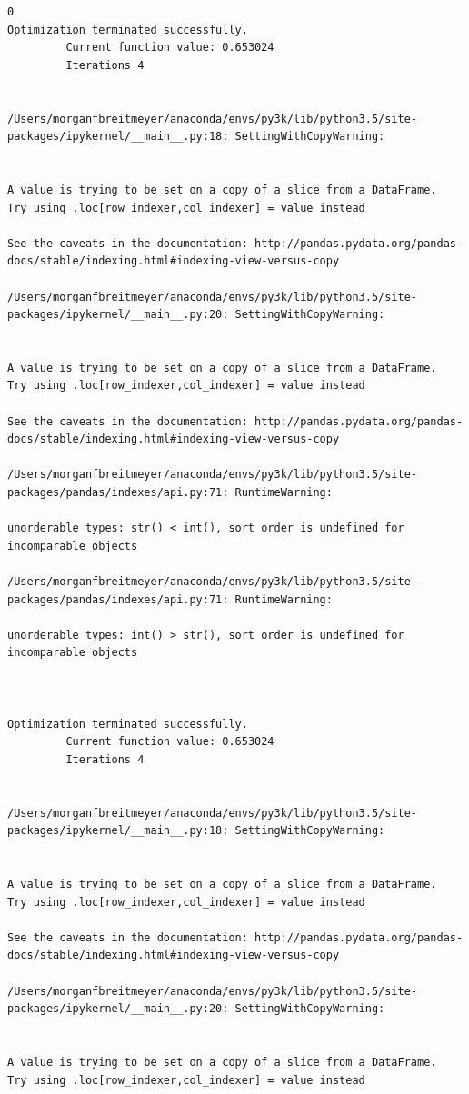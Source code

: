 \begin{lstlisting}
0
Optimization terminated successfully.
         Current function value: 0.653024
         Iterations 4


/Users/morganfbreitmeyer/anaconda/envs/py3k/lib/python3.5/site-packages/ipykernel/__main__.py:18: SettingWithCopyWarning:


A value is trying to be set on a copy of a slice from a DataFrame.
Try using .loc[row_indexer,col_indexer] = value instead

See the caveats in the documentation: http://pandas.pydata.org/pandas-docs/stable/indexing.html#indexing-view-versus-copy

/Users/morganfbreitmeyer/anaconda/envs/py3k/lib/python3.5/site-packages/ipykernel/__main__.py:20: SettingWithCopyWarning:


A value is trying to be set on a copy of a slice from a DataFrame.
Try using .loc[row_indexer,col_indexer] = value instead

See the caveats in the documentation: http://pandas.pydata.org/pandas-docs/stable/indexing.html#indexing-view-versus-copy

/Users/morganfbreitmeyer/anaconda/envs/py3k/lib/python3.5/site-packages/pandas/indexes/api.py:71: RuntimeWarning:

unorderable types: str() < int(), sort order is undefined for incomparable objects

/Users/morganfbreitmeyer/anaconda/envs/py3k/lib/python3.5/site-packages/pandas/indexes/api.py:71: RuntimeWarning:

unorderable types: int() > str(), sort order is undefined for incomparable objects



Optimization terminated successfully.
         Current function value: 0.653024
         Iterations 4


/Users/morganfbreitmeyer/anaconda/envs/py3k/lib/python3.5/site-packages/ipykernel/__main__.py:18: SettingWithCopyWarning:


A value is trying to be set on a copy of a slice from a DataFrame.
Try using .loc[row_indexer,col_indexer] = value instead

See the caveats in the documentation: http://pandas.pydata.org/pandas-docs/stable/indexing.html#indexing-view-versus-copy

/Users/morganfbreitmeyer/anaconda/envs/py3k/lib/python3.5/site-packages/ipykernel/__main__.py:20: SettingWithCopyWarning:


A value is trying to be set on a copy of a slice from a DataFrame.
Try using .loc[row_indexer,col_indexer] = value instead


\end{lstlisting}
